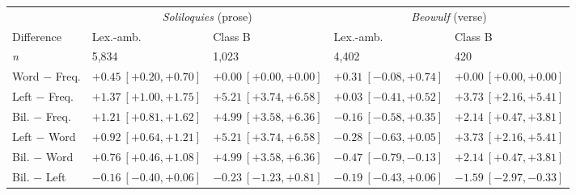 \begin{tabular}{@{}lllll@{}}
\toprule
 & \multicolumn{2}{c}{\textit{Soliloquies} (prose)} & \multicolumn{2}{c}{\textit{Beowulf} (verse)} \\
\cmidrule(lr){2-3}\cmidrule(l){4-5}
Difference & Lex.-amb. & Class B & Lex.-amb. & Class B \\
\textit{n} & 5,834 & 1,023 & 4,402 & 420 \\
\midrule
Word $-$ Freq. & $+0.45\ [+0.20, +0.70]$ & $+0.00\ [+0.00, +0.00]$ & $+0.31\ [-0.08, +0.74]$ & $+0.00\ [+0.00, +0.00]$ \\
Left $-$ Freq. & $+1.37\ [+1.00, +1.75]$ & $+5.21\ [+3.74, +6.58]$ & $+0.03\ [-0.41, +0.52]$ & $+3.73\ [+2.16, +5.41]$ \\
Bil. $-$ Freq. & $+1.21\ [+0.81, +1.62]$ & $+4.99\ [+3.58, +6.36]$ & $-0.16\ [-0.58, +0.35]$ & $+2.14\ [+0.47, +3.81]$ \\
Left $-$ Word & $+0.92\ [+0.64, +1.21]$ & $+5.21\ [+3.74, +6.58]$ & $-0.28\ [-0.63, +0.05]$ & $+3.73\ [+2.16, +5.41]$ \\
Bil. $-$ Word & $+0.76\ [+0.46, +1.08]$ & $+4.99\ [+3.58, +6.36]$ & $-0.47\ [-0.79, -0.13]$ & $+2.14\ [+0.47, +3.81]$ \\
Bil. $-$ Left & $-0.16\ [-0.40, +0.06]$ & $-0.23\ [-1.23, +0.81]$ & $-0.19\ [-0.43, +0.06]$ & $-1.59\ [-2.97, -0.33]$ \\
\bottomrule
\end{tabular}

